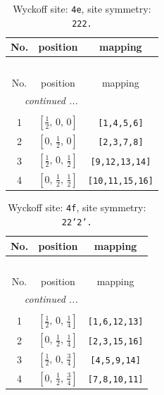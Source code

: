 \documentclass[fleqn,8pt]{jsarticle}
\begin{document}
\begin{longtable}{ccc}
\caption{Wyckoff site: {\tt 4e}, site symmetry: {\tt 222.}}
 \\
 \hline \hline
No. & position & mapping \\ \hline \endfirsthead

\multicolumn{2}{l}{\tablename\ \thetable{}} \\
 \hline \hline
No. & position & mapping \\ \hline \endhead

 \hline \hline
\multicolumn{2}{r}{\footnotesize\it continued ...} \\ \endfoot

 \hline \hline
\multicolumn{2}{r}{} \\ \endlastfoot

1 & $\left[ \frac{1}{2},\, 0,\, 0 \right]$ & {\tt [1,4,5,6]} \\ \hline
2 & $\left[ 0,\, \frac{1}{2},\, 0 \right]$ & {\tt [2,3,7,8]} \\ \hline
3 & $\left[ \frac{1}{2},\, 0,\, \frac{1}{2} \right]$ & {\tt [9,12,13,14]} \\ \hline
4 & $\left[ 0,\, \frac{1}{2},\, \frac{1}{2} \right]$ & {\tt [10,11,15,16]} \\
\end{longtable}
\renewcommand{\arraystretch}{1.2}
\begin{longtable}{ccc}
\caption{Wyckoff site: {\tt 4f}, site symmetry: {\tt 22'2'.}}
 \\
 \hline \hline
No. & position & mapping \\ \hline \endfirsthead

\multicolumn{2}{l}{\tablename\ \thetable{}} \\
 \hline \hline
No. & position & mapping \\ \hline \endhead

 \hline \hline
\multicolumn{2}{r}{\footnotesize\it continued ...} \\ \endfoot

 \hline \hline
\multicolumn{2}{r}{} \\ \endlastfoot

1 & $\left[ \frac{1}{2},\, 0,\, \frac{1}{4} \right]$ & {\tt [1,6,12,13]} \\ \hline
2 & $\left[ 0,\, \frac{1}{2},\, \frac{1}{4} \right]$ & {\tt [2,3,15,16]} \\ \hline
3 & $\left[ \frac{1}{2},\, 0,\, \frac{3}{4} \right]$ & {\tt [4,5,9,14]} \\ \hline
4 & $\left[ 0,\, \frac{1}{2},\, \frac{3}{4} \right]$ & {\tt [7,8,10,11]} \\
\end{longtable}
\end{document}
